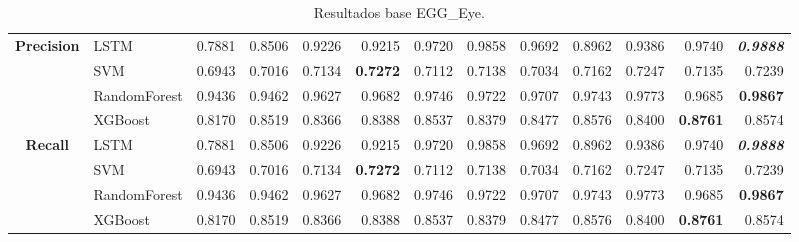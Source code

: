 \begin{table}[H]
\begin{adjustbox}{max width=14cm}
\begin{tabular}{|c|l|r|r|r|r|r|r|r|r|r|r|r|}
			\hline
			\textbf{Precision} & LSTM &  0.7881 &  0.8506 &  0.9226 &  0.9215 &  0.9720 &  0.9858 &  0.9692 &  0.8962 &  0.9386 &  0.9740 &  \textit{\textbf{0.9888}} \\
			& SVM &  0.6943 &  0.7016 &  0.7134 &  \textbf{0.7272} &  0.7112 &  0.7138 &  0.7034 &  0.7162 &  0.7247 &  0.7135 &  0.7239 \\
			& RandomForest &  0.9436 &  0.9462 &  0.9627 &  0.9682 &  0.9746 &  0.9722 &  0.9707 &  0.9743 &  0.9773 &  0.9685 &  \textbf{0.9867} \\
			& XGBoost &  0.8170 &  0.8519 &  0.8366 &  0.8388 &  0.8537 &  0.8379 &  0.8477 &  0.8576 &  0.8400 &  \textbf{0.8761} &  0.8574 \\
			\hline
			\textbf{Recall} &  LSTM &  0.7881 &  0.8506 &  0.9226 &  0.9215 &  0.9720 &  0.9858 &  0.9692 &  0.8962 &  0.9386 &  0.9740 & \textit{ \textbf{  0.9888 } } \\
			&  SVM &  0.6943 &  0.7016 &  0.7134 & \textbf{  0.7272 } &  0.7112 &  0.7138 &  0.7034 &  0.7162 &  0.7247 &  0.7135 &  0.7239 \\
			&  RandomForest &  0.9436 &  0.9462 &  0.9627 &  0.9682 &  0.9746 &  0.9722 &  0.9707 &  0.9743 &  0.9773 &  0.9685 & \textbf{  0.9867 } \\
			&  XGBoost &  0.8170 &  0.8519 &  0.8366 &  0.8388 &  0.8537 &  0.8379 &  0.8477 &  0.8576 &  0.8400 & \textbf{  0.8761 } &  0.8574 \\
			\hline
		\end{tabular}
	\end{adjustbox}
	\caption{Resultados base EGG\_Eye.}
	\label{tab:EGGEyebase}
\end{table}
